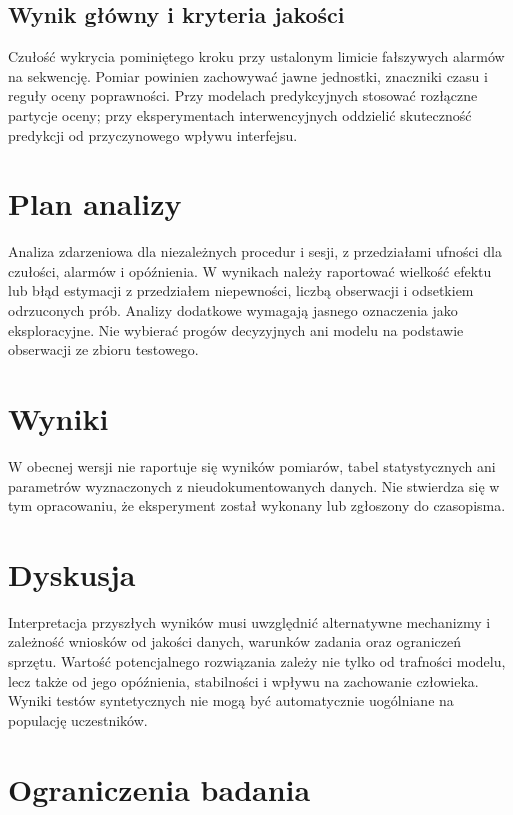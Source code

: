 \documentclass[11pt,a4paper]{article}
\begin{document}
\subsection{Wynik główny i kryteria jakości}

Czułość wykrycia pominiętego kroku przy ustalonym limicie fałszywych alarmów na sekwencję. Pomiar powinien zachowywać jawne jednostki, znaczniki czasu i reguły oceny poprawności. Przy modelach predykcyjnych stosować rozłączne partycje oceny; przy eksperymentach interwencyjnych oddzielić skuteczność predykcji od przyczynowego wpływu interfejsu.

\section{Plan analizy}

Analiza zdarzeniowa dla niezależnych procedur i sesji, z przedziałami ufności dla czułości, alarmów i opóźnienia. W wynikach należy raportować wielkość efektu lub błąd estymacji z przedziałem niepewności, liczbą obserwacji i odsetkiem odrzuconych prób. Analizy dodatkowe wymagają jasnego oznaczenia jako eksploracyjne. Nie wybierać progów decyzyjnych ani modelu na podstawie obserwacji ze zbioru testowego.

\section{Wyniki}

W obecnej wersji nie raportuje się wyników pomiarów, tabel statystycznych ani parametrów wyznaczonych z nieudokumentowanych danych. Nie stwierdza się w tym opracowaniu, że eksperyment został wykonany lub zgłoszony do czasopisma.

\section{Dyskusja}

Interpretacja przyszłych wyników musi uwzględnić alternatywne mechanizmy i zależność wniosków od jakości danych, warunków zadania oraz ograniczeń sprzętu. Wartość potencjalnego rozwiązania zależy nie tylko od trafności modelu, lecz także od jego opóźnienia, stabilności i wpływu na zachowanie człowieka. Wyniki testów syntetycznych nie mogą być automatycznie uogólniane na populację uczestników.

\section{Ograniczenia badania}
\end{document}

